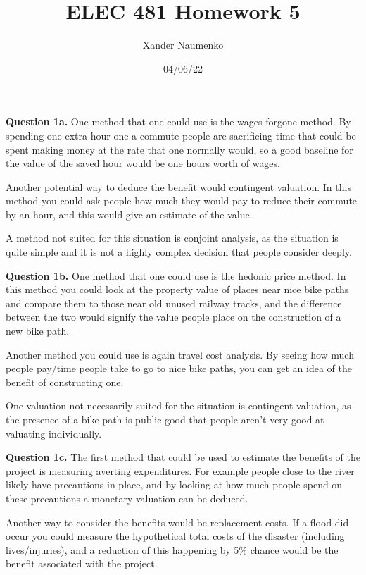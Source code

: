 \documentclass[letterpaper, reqno,11pt]{article}
\begin{document}
\title{ELEC 481 Homework 5}
\date{04/06/22}
\author{Xander Naumenko}
\maketitle

{\noindent\bf Question 1a.} One method that one could use is the wages forgone method. By spending one extra hour one a commute people are sacrificing time that could be spent making money at the rate that one normally would, so a good baseline for the value of the saved hour would be one hours worth of wages. 

Another potential way to deduce the benefit would contingent valuation. In this method you could ask people how much they would pay to reduce their commute by an hour, and this would give an estimate of the value. 

A method not suited for this situation is conjoint analysis, as the situation is quite simple and it is not a highly complex decision that people consider deeply. 

{\noindent\bf Question 1b.} One method that one could use is the hedonic price method. In this method you could look at the property value of places near nice bike paths and compare them to those near old unused railway tracks, and the difference between the two would signify the value people place on the construction of a new bike path. 

Another method you could use is again travel cost analysis. By seeing how much people pay/time people take to go to nice bike paths, you can get an idea of the benefit of constructing one. 

One valuation not necessarily suited for the situation is contingent valuation, as the presence of a bike path is public good that people aren't very good at valuating individually. 

{\noindent\bf Question 1c.} The first method that could be used to estimate the benefits of the project is measuring averting expenditures. For example people close to the river likely have precautions in place, and by looking at how much people spend on these precautions a monetary valuation can be deduced. 

Another way to consider the benefits would be replacement costs. If a flood did occur you could measure the hypothetical total costs of the disaster (including lives/injuries), and a reduction of this happening by 5\% chance would be the benefit associated with the project. 
\end{document}
